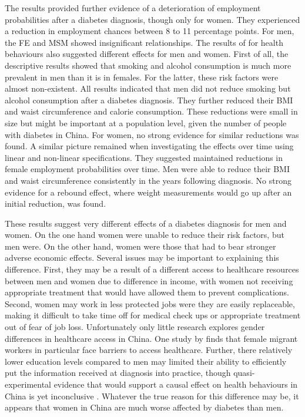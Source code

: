 The results provided further evidence of a deterioration of employment probabilities after a diabetes diagnosis, though only for women. They experienced a reduction in employment chances between 8 to 11 percentage points. For men, the \ac{FE} and \ac{MSM} showed insignificant relationships. The results of for health behaviours also suggested different effects for men and women. First of all, the descriptive results showed that smoking and alcohol consumption is much more prevalent in men than it is in females. For the latter, these risk factors were almost non-existent. All results indicated that men did not reduce smoking but alcohol consumption after a diabetes diagnosis. They further reduced their \ac{BMI} and waist circumference and calorie consumption. These reductions were small in size but might be important at a population level, given the number of people with diabetes in China. For women, no strong evidence for similar reductions was found. A similar picture remained when investigating the effects over time using linear and non-linear specifications. They suggested maintained reductions in female employment probabilities over time. Men were able to reduce their \ac{BMI} and waist circumference consistently in the years following diagnosis. No strong evidence for a rebound effect, where weight measurements would go up after an initial reduction, was found. 

These results suggest very different effects of a diabetes diagnosis for men and women. On the one hand women were unable to reduce their risk factors, but men were. On the other hand, women were those that had to bear stronger adverse economic effects. Several issues may be important to explaining this difference. First, they may be a result of a different access to healthcare resources between men and women due to difference in income, with women not receiving appropriate treatment that would have allowed them to prevent complications. Second, women may work in less protected jobs were they are easily replaceable, making it difficult to take time off for medical check ups or appropriate treatment out of fear of job loss. Unfortunately only little research explores gender differences in healthcare access in China. One study by \textcite{Fan2013} finds that female migrant workers in particular face barriers to access healthcare. Further, there relatively lower education levels compared to men may limited their ability to efficiently put the information received at diagnosis into practice, though quasi-experimental evidence that would support a causal effect on health behaviours in China is yet inconclusive \parencite{Xie2014a}. Whatever the true reason for this difference may be, it appears that women in China are much worse affected by diabetes than men.

